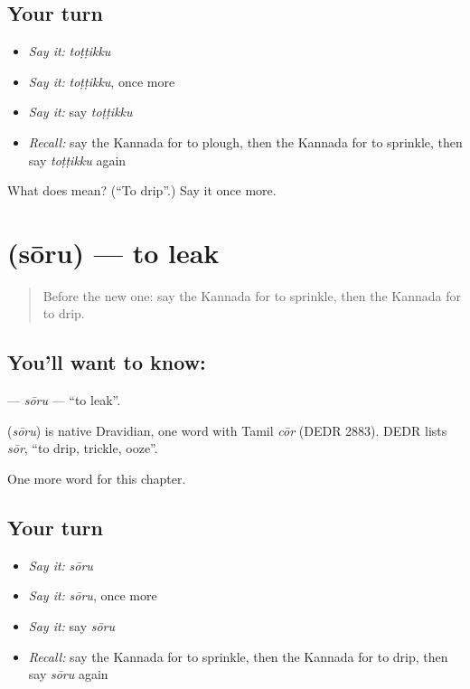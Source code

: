 \subsection*{Your turn}
\begin{itemize}
\raggedright
  \item \emph{Say it:} \emph{toṭṭikku}
  \item \emph{Say it:} \emph{toṭṭikku}, once more
  \item \emph{Say it:} say \emph{toṭṭikku}
  \item \emph{Recall:} say the Kannada for to plough, then the Kannada for to sprinkle, then say \emph{toṭṭikku} again
\end{itemize}

\begin{tcolorbox}[breakable,colback=teal!4,colframe=teal!35!black,title={Before you move on}]
What does  mean? (\textquotedblleft{}To drip\textquotedblright{}.) Say it once more.
\end{tcolorbox}
\section[\texorpdfstring{\kn{ಸೋರು} (sōru)}{ಸೋರು (sōru)}]{ (sōru) — to leak}

\label{lesson:KA-C166-soru}



\begin{quote}
Before the new one: say the Kannada for to sprinkle, then the Kannada for to drip.
\end{quote}

\subsection*{You'll want to know: }
\textbf{} — \emph{sōru} — \textquotedblleft{}to leak\textquotedblright{}.

\begin{cousinweb}
\textbf{} (\emph{sōru}) is native Dravidian, one word with Tamil \emph{cōr} (DEDR 2883). DEDR lists \emph{sōr}, \textquotedblleft{}to drip, trickle, ooze\textquotedblright{}.
\end{cousinweb}

\begin{grammarlens}[title={What you've built}]
One more word for this chapter.
\end{grammarlens}

\subsection*{Your turn}
\begin{itemize}
\raggedright
  \item \emph{Say it:} \emph{sōru}
  \item \emph{Say it:} \emph{sōru}, once more
  \item \emph{Say it:} say \emph{sōru}
  \item \emph{Recall:} say the Kannada for to sprinkle, then the Kannada for to drip, then say \emph{sōru} again
\end{itemize}


